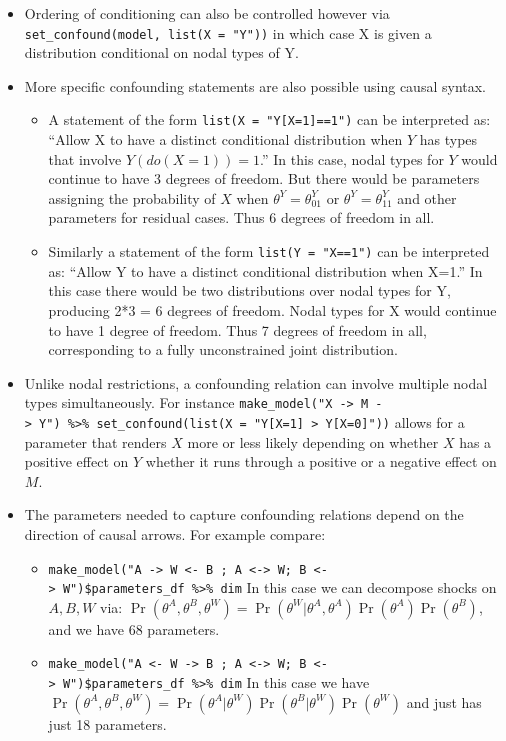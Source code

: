 \documentclass[
  12pt,
]{book}
\providecommand{\tightlist}{%
  \setlength{\itemsep}{0pt}\setlength{\parskip}{0pt}}
\begin{document}
\begin{itemize}
\item
  Ordering of conditioning can also be controlled however via \texttt{set\_confound(model,\ list(X\ =\ "Y"))} in which case X is given a distribution conditional on nodal types of Y.
\item
  More specific confounding statements are also possible using causal syntax.

  \begin{itemize}
  \tightlist
  \item
    A statement of the form \texttt{list(X\ =\ "Y{[}X=1{]}==1")} can be interpreted as: ``Allow X to have a distinct conditional distribution when \(Y\) has types that involve \(Y(do(X=1))=1\).'' In this case, nodal types for \(Y\) would continue to have 3 degrees of freedom. But there would be parameters assigning the probability of \(X\) when \(\theta^Y = \theta^Y_{01}\) or \(\theta^Y = \theta^Y_{11}\) and other parameters for residual cases. Thus 6 degrees of freedom in all.
  \item
    Similarly a statement of the form \texttt{list(Y\ =\ "X==1")} can be interpreted as: ``Allow Y to have a distinct conditional distribution when X=1.'' In this case there would be two distributions over nodal types for Y, producing 2*3 = 6 degrees of freedom. Nodal types for X would continue to have 1 degree of freedom. Thus 7 degrees of freedom in all, corresponding to a fully unconstrained joint distribution.
  \end{itemize}
\item
  Unlike nodal restrictions, a confounding relation can involve multiple nodal types simultaneously. For instance \texttt{make\_model("X\ -\textgreater{}\ M\ -\textgreater{}\ Y")\ \%\textgreater{}\%\ set\_confound(list(X\ =\ "Y{[}X=1{]}\ \textgreater{}\ Y{[}X=0{]}"))} allows for a parameter that renders \(X\) more or less likely depending on whether \(X\) has a positive effect on \(Y\) whether it runs through a positive or a negative effect on \(M\).
\item
  The parameters needed to capture confounding relations depend on the direction of causal arrows. For example compare:

  \begin{itemize}
  \tightlist
  \item
    \texttt{make\_model("A\ -\textgreater{}\ W\ \textless{}-\ B\ ;\ A\ \textless{}-\textgreater{}\ W;\ B\ \textless{}-\textgreater{}\ W")\$parameters\_df\ \%\textgreater{}\%\ dim} In this case we can decompose shocks on \(A, B, W\) via: \(\Pr(\theta^A, \theta^B, \theta^W) = \Pr(\theta^W | \theta^A, \theta^A)\Pr(\theta^A)\Pr(\theta^B)\), and we have 68 parameters.
  \item
    \texttt{make\_model("A\ \textless{}-\ W\ -\textgreater{}\ B\ ;\ A\ \textless{}-\textgreater{}\ W;\ B\ \textless{}-\textgreater{}\ W")\$parameters\_df\ \%\textgreater{}\%\ dim} In this case we have \(\Pr(\theta^A, \theta^B, \theta^W) = \Pr(\theta^A | \theta^W)\Pr(\theta^B|\theta^W)\Pr(\theta^W)\) and just has just 18 parameters.
  \end{itemize}
\end{itemize}
\end{document}
